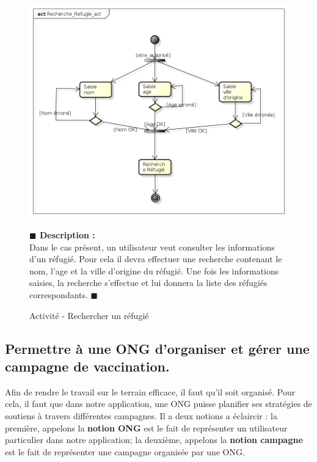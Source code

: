 \documentclass[11pt, titlepage]{report}
\newcommand{\debutDescription}{\noindent\textbf{\textcolor{DescriptionColor}{$\blacksquare$  Description : \\}}}
\newcommand{\finDescription}{\noindent\textcolor{DescriptionColor}{$\blacksquare$}}
\begin{document}
\begin{figure}[h!]
\begin{center}
\includegraphics[scale=.4]{../images/diagrammes/uml/exigence_1/act_recherche_refugie.png} 
\caption{Activité - Rechercher un réfugié}
\end{center}
\debutDescription
Dans le cas présent, un utilisateur veut consulter les informations d'un réfugié. Pour cela il devra effectuer une recherche contenant le nom, l'age et la ville d'origine du réfugié. Une fois les informations saisies, la recherche s'effectue et lui donnera la liste des réfugiés correspondants.
\finDescription
\end{figure}


\clearpage
\subsection{Permettre à une ONG d'organiser et gérer une campagne de vaccination.}
Afin de rendre le travail sur le terrain efficace, il faut qu'il soit organisé. Pour cela, il faut que dans notre application, une ONG puisse planifier ses stratégies de soutiens à travers différentes campagnes. Il a deux notions a éclaircir : la première, appelons la \textbf{notion ONG} est le fait de représenter un utilisateur particulier dans notre application; la deuxième, appelons la \textbf{notion campagne} est le fait de représenter une campagne organisée par une ONG.
\end{document}
